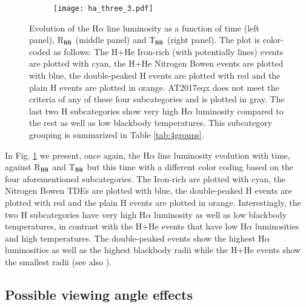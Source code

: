 \documentclass[structabstract]{aa}
\begin{document}
\begin{figure*}
        \centering
        \begin{subfigure}[b]{1\textwidth}
            \centering
            \texttt{[image: ha\_three\_3.pdf]}
        \end{subfigure}
        \caption
        {Evolution of the H$\alpha$ line luminosity as a function of time (left panel), R$_{\rm BB}$ (middle panel) and T$_{\rm BB}$ (right panel). The plot is color-coded as follows: The H+He Iron-rich (with potentially  lines) events are plotted with cyan, the H+He Nitrogen Bowen events are plotted with blue, the double-peaked H events are plotted with red and the plain H events are plotted in orange. AT2017eqx does not meet the criteria of any of these four subcategories and is plotted in gray. The last two H subcategories show very high H$\alpha$ luminosity compared to the rest as well as low blackbody temperatures. This subcategory grouping is summarized in Table \ref{tab:4groups}.} 
        \label{fig:ha_three}
    \end{figure*}
    

In Fig. \ref{fig:ha_three} we present, once again, the H$\alpha$ line luminosity evolution with time, against R$_{\rm BB}$ and T$_{\rm BB}$ but this time with a different color coding based on the four aforementioned subcategories. The Iron-rich are plotted with cyan, the Nitrogen Bowen TDEs are plotted with blue, the double-peaked H events are plotted with red and the plain H events are plotted in orange. Interestingly, the two H subcategories have very high H$\alpha$ luminosity as well as low blackbody temperatures, in contrast with the H+He events that have low H$\alpha$ luminosities and high temperatures. The double-peaked events show the highest H$\alpha$ luminosities as well as the highest blackbody radii while the H+He events show the smallest radii (see also \citealt{vanvelzen2021}).




\subsection{Possible viewing angle effects} \label{subsec:view}
\end{document}
